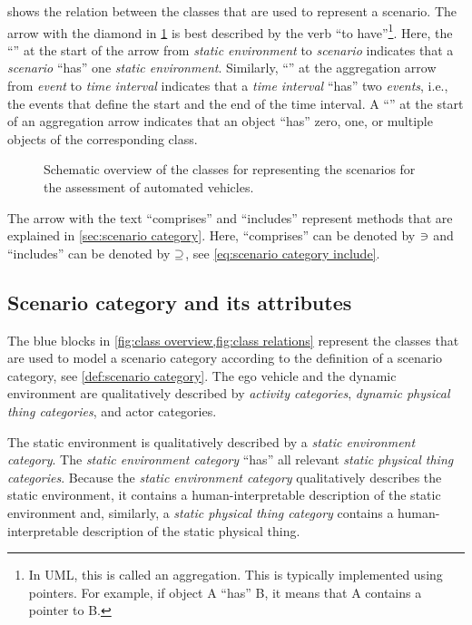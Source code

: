 \cstartb {} shows the relation between the classes that are used to represent a scenario. \cendb
The arrow with the diamond in \cref{fig:class relations} is best described by the verb ``to have''\footnote{In UML, this is called an aggregation.  This is typically implemented using pointers. For example, if object A ``has'' B, it means that A contains a pointer to B.}. 
\cstartb Here, the ``\hasone'' at the start of the arrow from \textit{static environment} to \textit{scenario} indicates that a \textit{scenario} ``has'' one \textit{static environment}. Similarly, ``\hastwo'' at the aggregation arrow from \textit{event} to \textit{time interval} indicates that a \textit{time interval} ``has'' two \textit{events}, i.e., the events that define the start and the end of the time interval. \cendb 
A ``\hasn'' at the start of an aggregation arrow indicates that an object ``has'' zero, one, or multiple objects of the corresponding class.

\begin{figure}[t]
	\centering
	
	\caption{Schematic overview of the classes for representing the scenarios for the assessment of automated vehicles.}
	\label{fig:class relations}
\end{figure}

The arrow with the text ``comprises'' and ``includes'' represent methods that are explained in \cref{sec:scenario category}. Here, ``comprises'' can be denoted by $\ni$ and ``includes'' can be denoted by $\supseteq$, see \cref{eq:scenario category include}. 



\subsection{Scenario category and its attributes}
\label{sec:domain scenario category}

The blue blocks in \cref{fig:class overview,fig:class relations} represent the classes that are used to model a scenario category according to the definition of a scenario category, see \cref{def:scenario category}.
The ego vehicle and the dynamic environment are qualitatively described by \textit{activity categories}, \cstartb\textit{dynamic physical thing categories}\cendb, and actor categories. 

The static environment is qualitatively described by a \textit{static environment category}. 
\cstartb The \textit{static environment category} ``has'' all relevant \textit{static physical thing categories}\cendb.
Because the \textit{static environment category} qualitatively describes the static environment, it contains a human-interpretable description of the static environment \cstartb and, similarly, a \textit{static physical thing category} contains a human-interpretable description of the static physical thing. \cendb

